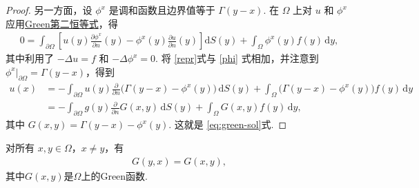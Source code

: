 \documentclass[../../main.tex]{subfiles}%
\begin{document}
\begin{proof}
另一方面，设 $\phi^x$ 是调和函数且边界值等于 $\varGamma (y-x)$. 在 $\Omega$ 上对 $u$ 和 $\phi^x$ 应用\hyperref[Basis of Analytics-theorem:Green第二恒等式]{Green第二恒等式}，得
\begin{align}
0=\int_{\partial\Omega}\left[u(y)\frac{\partial\phi^x}{\partial n}(y)-\phi^x(y)\frac{\partial u}{\partial n}(y)\right]\mathrm{d}S(y)+\int_\Omega \phi^x(y) f(y)\,\mathrm{d}y, \label{phi}
\end{align}
其中利用了 $-\Delta u=f$ 和 $-\Delta\phi^x=0$.
将 \eqref{repr}式与 \eqref{phi} 式相加，并注意到 $\phi^x|_{\partial\Omega}=\varGamma (y-x)$，得到
\begin{align*}
u(x)
&= -\int_{\partial\Omega} u(y)\frac{\partial}{\partial n}\big(\varGamma (y-x)-\phi^x(y)\big)\,\mathrm{d}S(y)
+\int_\Omega \big(\varGamma (y-x)-\phi^x(y)\big) f(y)\,\mathrm{d}y \\
&= -\int_{\partial\Omega} g(y)\frac{\partial}{\partial n}G(x,y)\,\mathrm{d}S(y)
+\int_\Omega G(x,y) f(y)\,\mathrm{d}y,
\end{align*}
其中 $G(x,y)=\varGamma (y-x)-\phi^x(y)$. 这就是 \eqref{eq:green-sol}式.
\end{proof}

\begin{theorem}
对所有 $x,y\in\Omega$，$x\neq y$，有
\begin{align*}
G(y,x) = G(x,y),
\end{align*}
其中$G(x,y)$是$\Omega$上的Green函数.
\end{theorem}
\end{document}
